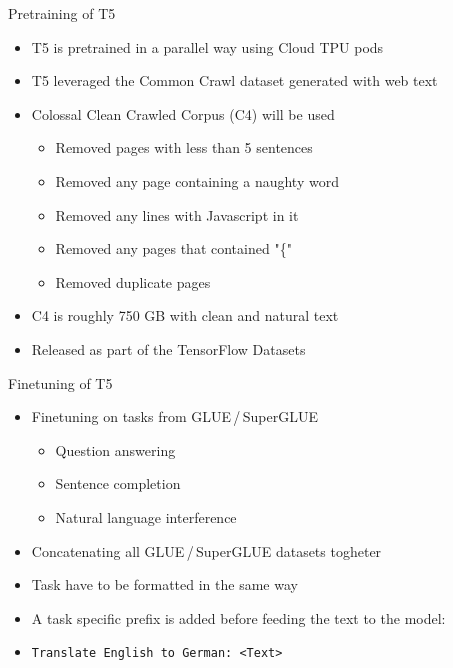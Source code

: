 \documentclass[english]{mlutalk}
\begin{document}
\begin{frame}{Pretraining of T5}
  \begin{itemize}
    \item T5 is pretrained in a parallel way using Cloud TPU pods
    \item T5 leveraged the Common Crawl dataset generated with web text
    \item Colossal Clean Crawled Corpus (C4) will be used
    \begin{itemize}
      \item Removed pages with less than 5 sentences 
      \item Removed any page containing a naughty word 
      \item Removed any lines with Javascript in it
      \item Removed any pages that contained "\{"
      \item Removed duplicate pages
    \end{itemize}
    \item C4 is roughly 750 GB with clean and natural text
    \item Released as part of the TensorFlow Datasets
  \end{itemize}
\end{frame}

\begin{frame}{Finetuning of T5}
    \begin{itemize}
      \item Finetuning on tasks from GLUE\,/\,SuperGLUE
      \begin{itemize}
        \item Question answering
        \item Sentence completion
        \item Natural language interference
      \end{itemize}
      \item Concatenating all GLUE\,/\,SuperGLUE datasets togheter
      \item Task have to be formatted in the same way
      \item A task specific prefix is added before feeding the text to the model:
      \item \texttt{Translate English to German: <Text>}
    \end{itemize}
\end{frame}
\end{document}
